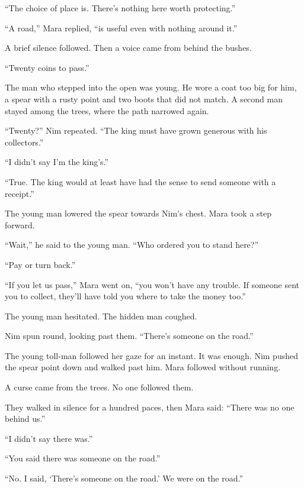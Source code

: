 \documentclass[10pt,a4paper]{article}
\begin{document}
“The choice of place is. There's nothing here worth protecting.”

“A road,” Mara replied, “is useful even with nothing around it.”

A brief silence followed. Then a voice came from behind the bushes.

“Twenty coins to pass.”

The man who stepped into the open was young. He wore a coat too big for him, a spear with a rusty point and two boots that did not match. A second man stayed among the trees, where the path narrowed again.

“Twenty?” Nim repeated. “The king must have grown generous with his collectors.”

“I didn't say I'm the king's.”

“True. The king would at least have had the sense to send someone with a receipt.”

The young man lowered the spear towards Nim's chest. Mara took a step forward.

“Wait,” he said to the young man. “Who ordered you to stand here?”

“Pay or turn back.”

“If you let us pass,” Mara went on, “you won't have any trouble. If someone sent you to collect, they'll have told you where to take the money too.”

The young man hesitated. The hidden man coughed.

Nim spun round, looking past them. “There's someone on the road.”

The young toll-man followed her gaze for an instant. It was enough. Nim pushed the spear point down and walked past him. Mara followed without running.

A curse came from the trees. No one followed them.

They walked in silence for a hundred paces, then Mara said: “There was no one behind us.”

“I didn't say there was.”

“You said there was someone on the road.”

“No. I said, ‘There's someone on the road.’ We were on the road.”
\end{document}

